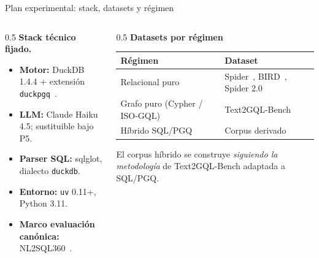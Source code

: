 \documentclass[aspectratio=169]{beamer}
\begin{document}
\begin{frame}{Plan experimental: stack, datasets y régimen}
\begin{columns}[T]
\begin{column}{0.5\textwidth}
\textbf{Stack técnico fijado.}
\begin{itemize}\footnotesize
    \item \textbf{Motor:} DuckDB 1.4.4 + extensión \texttt{duckpgq}~\parencite{DuckPGQ}.
    \item \textbf{LLM:} Claude Haiku 4.5; sustituible bajo P5.
    \item \textbf{Parser SQL:} sqlglot, dialecto \texttt{duckdb}.
    \item \textbf{Entorno:} \texttt{uv} 0.11+, Python 3.11.
    \item \textbf{Marco evaluación canónica:} NL2SQL360~\parencite{SuperSQL2024}.
\end{itemize}
\end{column}
\begin{column}{0.5\textwidth}
\textbf{Datasets por régimen}
\begin{tabular}{@{}lp{3.0cm}@{}}
\toprule
\scriptsize\textbf{Régimen} & \scriptsize\textbf{Dataset} \\
\midrule
\scriptsize Relacional puro & \scriptsize Spider~\parencite{Spider2018}, BIRD~\parencite{BIRD2023}, Spider 2.0~\parencite{spider2_2025} \\
\scriptsize Grafo puro (Cypher / ISO-GQL) & \scriptsize Text2GQL-Bench~\parencite{text2gqlbench} \\
\scriptsize Híbrido SQL/PGQ & \scriptsize Corpus derivado\\
\bottomrule
\end{tabular}

\vspace{0.25cm}
\scriptsize El corpus híbrido se construye \emph{siguiendo la metodología} de Text2GQL-Bench adaptada a SQL/PGQ.
\end{column}
\end{columns}
\end{frame}
\end{document}

